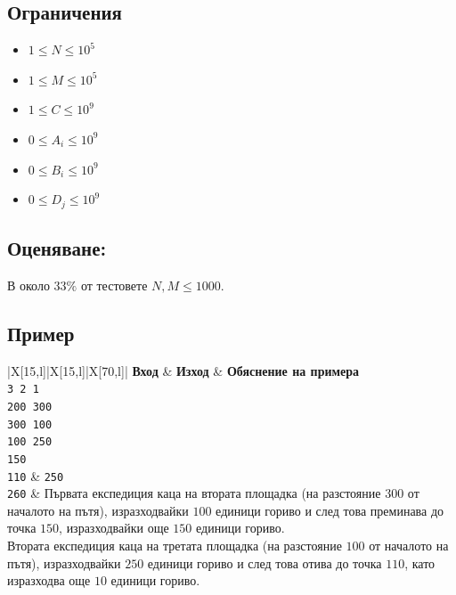 \documentclass[12pt]{article}
\begin{document}
\subsection{Ограничения}
\vspace{0.1em}
\begin{itemize}
	\item $1 \leq N\leq 10^5$
	\item $1 \leq M \leq 10^5$
	\item $1 \leq C \leq 10^9$
	\item $0 \leq A_i \leq 10^9$
	\item $0 \leq B_i \leq 10^9$
	\item $0 \leq D_j \leq 10^9$
\end{itemize}

\subsection{Оценяване:}
В около $33\%$ от тестовете $N, M \leq 1000$. 

\subsection{Пример}
\begin{table}[ht]
	\begin{tblr}{|X[15,l]|X[15,l]|X[70,l]|}
		\hline
		\textbf{Вход} & \textbf{Изход} & \textbf{Обяснение на примера} \\
		\hline
		{\texttt{3 2 1\\200 300\\300 100\\100 250\\150\\110}} & 
		{\texttt{250\\260}} &
		{Първата експедиция каца на втората площадка (на разстояние $300$ от началото на пътя), изразходвайки $100$ единици гориво и след това преминава до точка $150$, изразходвайки още $150$ единици гориво.\\[1em] Втората експедиция каца на третата площадка (на разстояние $100$ от началото на пътя), изразходвайки $250$ единици гориво и след това отива до точка $110$, като изразходва още $10$ единици гориво.} \\
		\hline
	\end{tblr}
\end{table}
\end{document}

